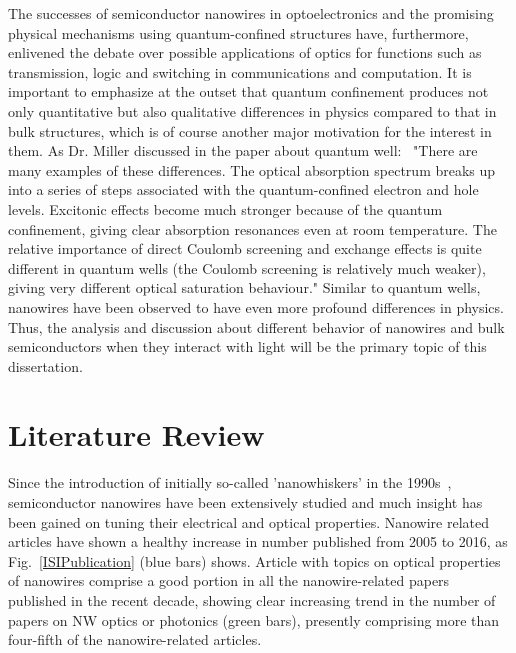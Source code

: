 The successes of semiconductor nanowires in optoelectronics and the promising
physical mechanisms using quantum-confined structures have, furthermore,
enlivened the debate over possible applications of optics for functions such as
transmission, logic and switching in communications and computation. It is
important to emphasize at the outset that quantum confinement produces not only
quantitative but also qualitative differences in physics compared to that in
bulk structures, which is of course another major motivation for the interest
in them. As Dr. Miller discussed in the paper about quantum
well:~\cite{schmitt1989linear} "There are many examples of these differences.
The optical absorption spectrum breaks up into a series of steps associated
with the quantum-confined electron and hole levels. Excitonic effects become
much stronger because of the quantum confinement, giving clear absorption
resonances even at room temperature. The relative importance of direct Coulomb
screening and exchange effects is quite different in quantum wells (the Coulomb
screening is relatively much weaker), giving very different optical saturation
behaviour." Similar to quantum wells, nanowires have been observed to have even
more profound differences in physics. Thus, the analysis and discussion about
different behavior of nanowires and bulk semiconductors when they interact with
light will be the primary topic of this dissertation.

\section{Literature Review} \label{sec:intro_LR}

Since the introduction of initially so-called 'nanowhiskers' in the
1990s~\cite{yazawa1991heteroepitaxial}, semiconductor nanowires have been
extensively studied and much insight has been gained on tuning their electrical
and optical properties. Nanowire related articles have shown a healthy increase
in number published from 2005 to 2016, as Fig.~\ref{ISIPublication} (blue bars)
shows. Article with topics on optical properties of nanowires comprise a good
portion in all the nanowire-related papers published in the recent decade,
showing clear increasing trend in the number of papers on NW optics or
photonics (green bars), presently comprising more than four-fifth of the
nanowire-related articles.

